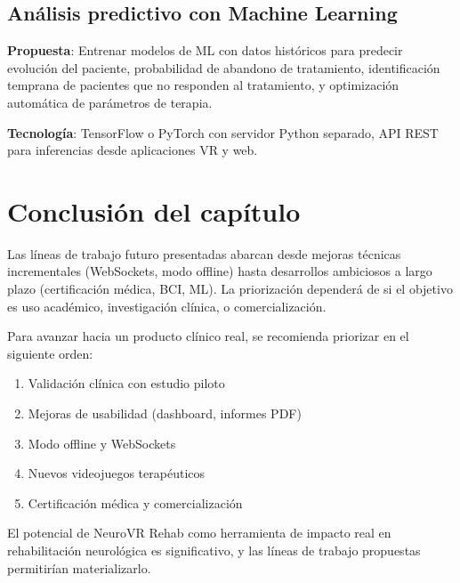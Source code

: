 \subsection{Análisis predictivo con Machine Learning}

\textbf{Propuesta}: Entrenar modelos de ML con datos históricos para predecir evolución del paciente, probabilidad de abandono de tratamiento, identificación temprana de pacientes que no responden al tratamiento, y optimización automática de parámetros de terapia.

\textbf{Tecnología}: TensorFlow o PyTorch con servidor Python separado, API REST para inferencias desde aplicaciones VR y web.

\section{Conclusión del capítulo}

Las líneas de trabajo futuro presentadas abarcan desde mejoras técnicas incrementales (WebSockets, modo offline) hasta desarrollos ambiciosos a largo plazo (certificación médica, BCI, ML). La priorización dependerá de si el objetivo es uso académico, investigación clínica, o comercialización.

Para avanzar hacia un producto clínico real, se recomienda priorizar en el siguiente orden:
\begin{enumerate}
    \item Validación clínica con estudio piloto
    \item Mejoras de usabilidad (dashboard, informes PDF)
    \item Modo offline y WebSockets
    \item Nuevos videojuegos terapéuticos
    \item Certificación médica y comercialización
\end{enumerate}

El potencial de NeuroVR Rehab como herramienta de impacto real en rehabilitación neurológica es significativo, y las líneas de trabajo propuestas permitirían materializarlo.
